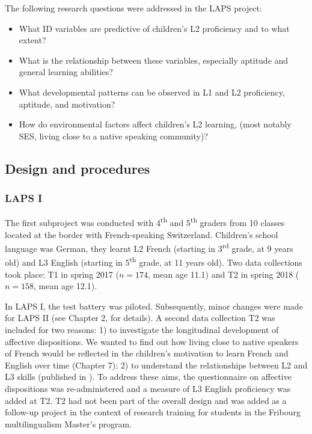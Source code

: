 \documentclass[output=paper]{langsci/langscibook}
\begin{document}
The following research questions were addressed in the LAPS project:

\begin{itemize}
\item What ID variables are predictive of children’s L2 proficiency and to what extent?
\item What is the relationship between these variables, especially aptitude and general learning abilities?
\item What developmental patterns can be observed in L1 and L2 proficiency, aptitude, and motivation?
\item How do environmental factors affect children’s L2 learning, (most notably SES, living close to a native speaking community)?
\end{itemize}


\subsection{Design and procedures}
\subsubsection{LAPS I}\largerpage

The first subproject was conducted with 4\textsuperscript{th} and 5\textsuperscript{th} graders from 10 classes located at the border with French-speaking Switzerland. Children’s school language was German, they learnt L2 French (starting in 3\textsuperscript{rd} grade, at 9 years old) and L3 English (starting in 5\textsuperscript{th} grade, at 11 years old). Two data collections took place: T1 in spring 2017 ($n=174$, mean age 11.1) and T2 in spring 2018 ($n=158$, mean age 12.1).

In LAPS I, the test battery was piloted. Subsequently, minor changes were made for LAPS II (see Chapter 2,  for details). A second data collection T2 was included for two reasons: 1) to investigate the longitudinal development of affective dispositions. We wanted to find out how living close to native speakers of French would be reflected in the children’s motivation to learn French and English over time (Chapter 7); 2) to understand the relationships between L2 and L3 skills (published in \citealt{BertheleUdry2019}). To address these aims, the questionnaire on affective dispositions was re-administered and a measure of L3 English proficiency was added at T2. T2 had not been part of the overall design and was added as a follow-up project in the context of research training for students in the Fribourg multilingualism Master’s program.
\end{document}
